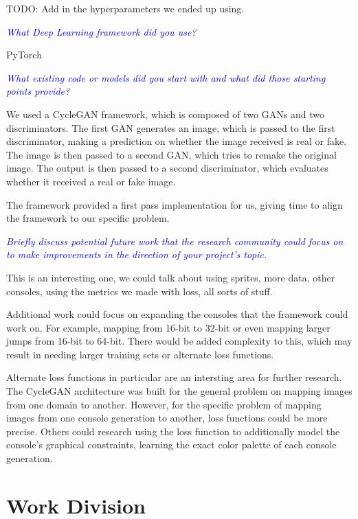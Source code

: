 \documentclass[10pt,twocolumn,letterpaper]{article}
\begin{document}
TODO: Add in the hyperparameters we ended up using.

\textit{\textcolor{blue}{What Deep Learning framework did you use?}}

PyTorch

\textit{\textcolor{blue}{What existing code or models did you start with and what did those starting points provide?}}

We used a CycleGAN framework, which is composed of two GANs and two discriminators. The first GAN generates an image, which is passed to the first discriminator, making a prediction on whether the image received is real or fake. The image is then passed to a second GAN, which tries to remake the original image. The output is then passed to a second discriminator, which evaluates whether it received a real or fake image.

The framework provided a first pass implementation for us, giving time to align the framework to our specific problem.

\textit{\textcolor{blue}{Briefly discuss potential future work that the research community could focus on to make improvements in the direction of your project's topic.}}

This is an interesting one, we could talk about using sprites, more data, other consoles, using the metrics we made with loss, all sorts of stuff.

Additional work could focus on expanding the consoles that the framework could work on. For example, mapping from 16-bit to 32-bit or even mapping larger jumps from 16-bit to 64-bit. There would be added complexity to this, which may result in needing larger training sets or alternate loss functions.

Alternate loss functions in particular are an intersting area for further research. The CycleGAN architecture was built for the general problem on mapping images from one domain to another. However, for the specific problem of mapping images from one console generation to another, loss functions could be more precise. Others could research using the loss function to additionally model the console's graphical constraints, learning the exact color palette of each console generation.


\section{Work Division}
\end{document}
